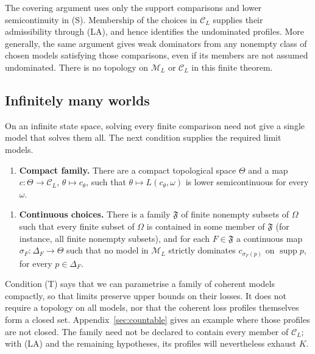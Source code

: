 \documentclass[11pt]{article}
\theoremstyle{definition}
\theoremstyle{remark}
\newcommand{\M}{\mathcal M}
\newcommand{\C}{\mathcal C}
\newcommand{\F}{\mathfrak F}
\newcommand{\supp}{\operatorname{supp}}
\begin{document}
The covering argument uses only the support comparisons and lower semicontinuity in (S). Membership of the choices in $\C_L$ supplies their admissibility through (LA), and hence identifies the undominated profiles. More generally, the same argument gives weak dominators from any nonempty class of chosen models satisfying those comparisons, even if its members are not assumed undominated. There is no topology on $\M_L$ or $\C_L$ in this finite theorem.

\subsection{Infinitely many worlds}
On an infinite state space, solving every finite comparison need not give a single model that solves them all. The next condition supplies the required limit models.
\begin{enumerate}[label=\textbf{(T)},leftmargin=*]
\item \textbf{Compact family.} There are a compact topological space $\Theta$ and a map $c:\Theta\to\C_L$, $\theta\mapsto c_\theta$, such that $\theta\mapsto L(c_\theta,\omega)$ is lower semicontinuous for every $\omega$.
\end{enumerate}
\begin{enumerate}[label=\textbf{(S$_\infty$)},leftmargin=*]
\item \textbf{Continuous choices.} There is a family $\F$ of finite nonempty subsets of $\Omega$ such that every finite subset of $\Omega$ is contained in some member of $\F$ (for instance, all finite nonempty subsets), and for each $F\in\F$ a continuous map $\sigma_F:\Delta_F\to\Theta$ such that no model in $\M_L$ strictly dominates $c_{\sigma_F(p)}$ on $\supp p$, for every $p\in\Delta_F$.
\end{enumerate}


Condition (T) says that we can parametrise a family of coherent models compactly, so that limits preserve upper bounds on their losses. It does not require a topology on all models, nor that the coherent loss profiles themselves form a closed set. Appendix~\ref{sec:countable} gives an example where those profiles are not closed. The family need not be declared to contain every member of $\C_L$; with (LA) and the remaining hypotheses, its profiles will nevertheless exhaust $K$.
\end{document}
